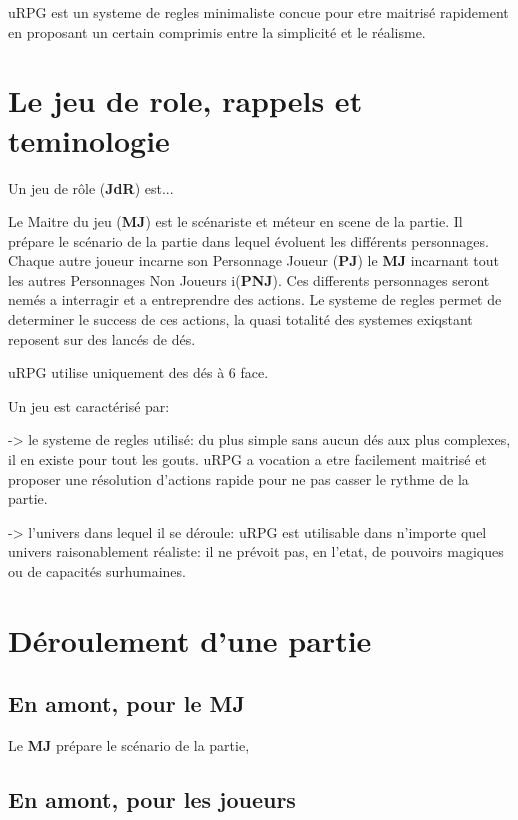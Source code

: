 
uRPG est un systeme de regles minimaliste concue pour etre maitrisé rapidement en proposant un certain comprimis entre la simplicité et le réalisme.

\section{Le jeu de role, rappels et teminologie}

Un jeu de rôle (\textbf{JdR}) est...


Le Maitre du jeu (\textbf{MJ}) est le scénariste et méteur en scene de la partie. Il prépare le scénario de la partie dans lequel évoluent les différents personnages.
Chaque autre joueur incarne son Personnage Joueur (\textbf{PJ}) le \textbf{MJ} incarnant tout les autres Personnages Non Joueurs i(\textbf{PNJ}).
Ces differents personnages seront nemés a interragir et a entreprendre des actions.
Le systeme de regles permet de determiner le success de ces actions, la quasi totalité des systemes exiqstant reposent sur des lancés de dés.

uRPG utilise uniquement des dés à 6 face.



Un jeu est caractérisé par:

-> le systeme de regles utilisé: du plus simple sans aucun dés aux plus complexes, il en existe pour tout les gouts. uRPG a vocation a etre facilement maitrisé et proposer une résolution d'actions rapide pour ne pas casser le rythme de la partie.  

-> l'univers dans lequel il se déroule: uRPG est utilisable dans n'importe quel univers raisonablement réaliste: il ne prévoit pas, en l'etat, de pouvoirs magiques ou de capacités surhumaines.


\section{Déroulement d'une partie}

\subsection{En amont, pour le \textbf{MJ}}

Le \textbf{MJ} prépare le scénario de la partie, 

\subsection{En amont, pour les joueurs}


